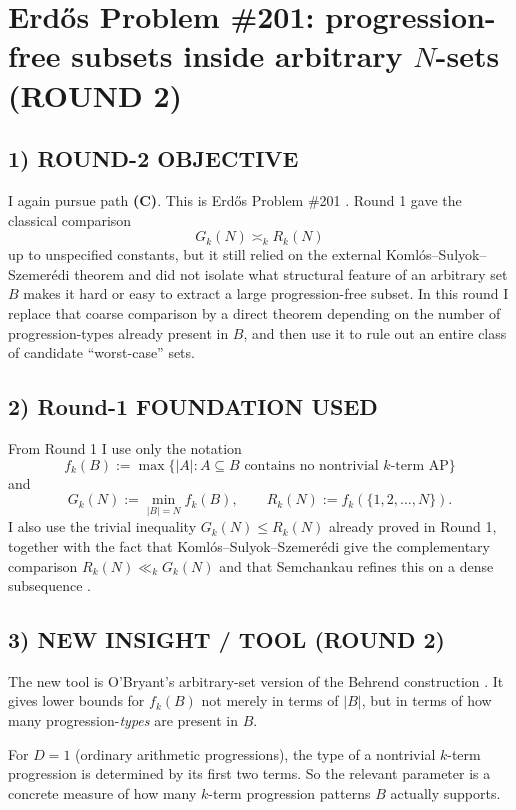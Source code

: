 \section{Erd\H{o}s Problem \#201: progression-free subsets inside arbitrary $N$-sets (ROUND 2)}

\subsection*{1) ROUND-2 OBJECTIVE}
I again pursue path \textbf{(C)}.  This is Erd\H{o}s Problem \#201 \cite{Bloom201}.  Round 1 gave the classical comparison
\[
G_k(N)\asymp_k R_k(N)
\]
up to unspecified constants, but it still relied on the external Koml\'os--Sulyok--Szemer\'edi theorem and did not isolate what structural feature of an arbitrary set $B$ makes it hard or easy to extract a large progression-free subset.  In this round I replace that coarse comparison by a direct theorem depending on the number of progression-types already present in $B$, and then use it to rule out an entire class of candidate ``worst-case'' sets.

\subsection*{2) Round-1 FOUNDATION USED}
From Round 1 I use only the notation
\[
f_k(B):=\max\{|A|: A\subseteq B\text{ contains no nontrivial }k\text{-term AP}\}
\]
and
\[
G_k(N):=\min_{|B|=N} f_k(B),
\qquad
R_k(N):=f_k(\{1,2,\dots,N\}).
\]
I also use the trivial inequality $G_k(N)\le R_k(N)$ already proved in Round 1, together with the fact that Koml\'os--Sulyok--Szemer\'edi give the complementary comparison $R_k(N)\ll_k G_k(N)$ and that Semchankau refines this on a dense subsequence \cite{KSS75,Semchankau20}.

\subsection*{3) NEW INSIGHT / TOOL (ROUND 2)}
The new tool is O'Bryant's arbitrary-set version of the Behrend construction \cite{OBryant10}.  It gives lower bounds for $f_k(B)$ not merely in terms of $|B|$, but in terms of how many progression-\emph{types} are present in $B$.

For $D=1$ (ordinary arithmetic progressions), the type of a nontrivial $k$-term progression is determined by its first two terms.  So the relevant parameter is a concrete measure of how many $k$-term progression patterns $B$ actually supports.

